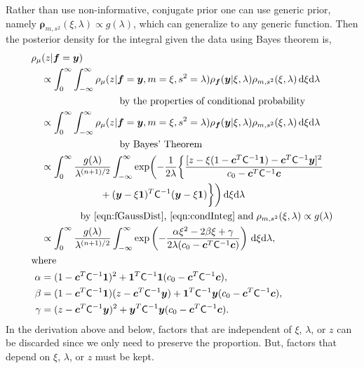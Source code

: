 \documentclass{iitthesis}          %
\newcommand{\bm}[1]{\boldsymbol{#1}}
\newcommand{\D}[1]{\text{d}{#1}}
\newcommand{\vc}{\bm{c}}
\newcommand{\vf}{\bm{f}}
\newcommand{\vrho}{\bm{\rho}}
\newcommand{\vy}{\bm{y}}
\newcommand{\vone}{\bm{1}}
\newcommand{\mC}{\mathsf{C}}
\begin{document}
Rather than use non-informative, conjugate prior one can use generic prior, namely $\vrho_{m,s^2}(\xi, \lambda) \propto g(\lambda)$, which can generalize to any generic function.
Then the posterior density for the integral given the data using Bayes theorem is,
\begin{align*}
\MoveEqLeft[1]{\rho_{\mu}(z | \vf = \vy)} \\
& \propto \int_{0}^\infty \int_{-\infty}^\infty \rho_{\mu}(z | \vf = \vy, m = \xi, s^2 = \lambda)  \rho_{\vf}(\vy | \xi, \lambda ) \rho_{m, s^2}(\xi, \lambda) \, \D \xi \D \lambda \\
&\qquad \qquad \qquad \qquad \text{by the properties of conditional probability} 
\\
& \propto \int_{0}^\infty \int_{-\infty}^\infty \rho_{\mu}(z | \vf = \vy, m = \xi, s^2 = \lambda)  \rho_{\vf}(\vy | \xi, \lambda ) \rho_{m, s^2}(\xi, \lambda) \, \D \xi \D \lambda \\
&\qquad \qquad \qquad \qquad \text{by Bayes' Theorem} 
\\
& \propto \displaystyle \int_{0}^\infty  \frac{g(\lambda)}{\lambda^{(n+1)/2}} 
\int_{-\infty}^\infty  \exp \biggl( -\frac{1}{2\lambda}\biggl\{
\frac{
	[z - \xi (1 - \vc^T \mC^{-1} \vone)  -  \vc^T \mC^{-1} \vy]^2}
{c_0  -\vc ^T \mC^{-1} \vc}  \\
& \qquad \qquad \qquad  + (\vy - \xi \vone)^T \mC^{-1}(\vy - \xi \vone) \biggr \} \biggr) \, \D \xi \D \lambda \\
&\qquad \qquad
\text{by \eqref{eqn:fGaussDist}, \eqref{eqn:condInteg}} \; \text{and} \; \rho_{m,s^2}(\xi,\lambda) \propto g(\lambda) \\
& \propto \displaystyle \int_{0}^\infty  \frac{g(\lambda)}{\lambda^{(n+1)/2}} \int_{-\infty}^\infty  \exp\left( -\frac{\alpha \xi^2 -2 \beta \xi + \gamma}{2\lambda(c_0  -\vc ^T \mC^{-1} \vc)} \right) \, \D \xi \D \lambda, \\
\intertext{where}
\alpha & = (1 - \vc^T \mC^{-1} \vone)^2 + \vone^T \mC^{-1} \vone (c_0  -\vc ^T \mC^{-1} \vc),\\
\beta & =(1 - \vc^T \mC^{-1} \vone)(z - \vc^T \mC^{-1} \vy )
+ \vone^T \mC^{-1} \vy (c_0  -\vc ^T \mC^{-1} \vc),\\
\gamma &  = (z - \vc^T \mC^{-1} \vy )^2  + \vy^T \mC^{-1} \vy (c_0  -\vc ^T \mC^{-1} \vc).
\end{align*}
In the derivation above and below, factors that are independent of $\xi$, $\lambda$, or $z$ can be discarded since we only need to preserve the proportion.  But, factors that depend on $\xi$, $\lambda$, or $z$ must be kept.  
\end{document}
